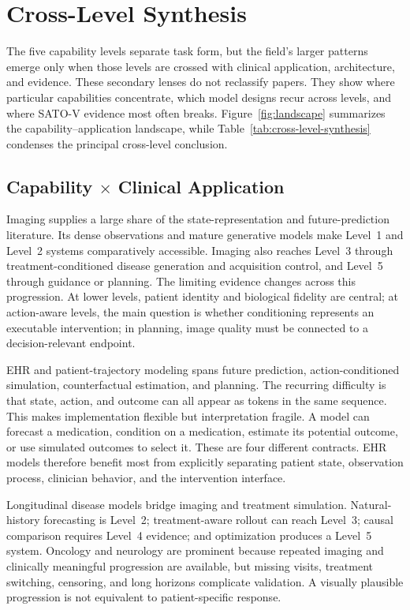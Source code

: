 \section{Cross-Level Synthesis}
\label{sec:synthesis}

The five capability levels separate task form, but the field's larger patterns emerge only when those levels are crossed with clinical application, architecture, and evidence. These secondary lenses do not reclassify papers. They show where particular capabilities concentrate, which model designs recur across levels, and where SATO-V evidence most often breaks. Figure~\ref{fig:landscape} summarizes the capability--application landscape, while Table~\ref{tab:cross-level-synthesis} condenses the principal cross-level conclusion.



\subsection{Capability $\times$ Clinical Application}

Imaging supplies a large share of the state-representation and future-prediction literature. Its dense observations and mature generative models make Level~1 and Level~2 systems comparatively accessible. Imaging also reaches Level~3 through treatment-conditioned disease generation and acquisition control, and Level~5 through guidance or planning. The limiting evidence changes across this progression. At lower levels, patient identity and biological fidelity are central; at action-aware levels, the main question is whether conditioning represents an executable intervention; in planning, image quality must be connected to a decision-relevant endpoint.

EHR and patient-trajectory modeling spans future prediction, action-conditioned simulation, counterfactual estimation, and planning. The recurring difficulty is that state, action, and outcome can all appear as tokens in the same sequence. This makes implementation flexible but interpretation fragile. A model can forecast a medication, condition on a medication, estimate its potential outcome, or use simulated outcomes to select it. These are four different contracts. EHR models therefore benefit most from explicitly separating patient state, observation process, clinician behavior, and the intervention interface.

Longitudinal disease models bridge imaging and treatment simulation. Natural-history forecasting is Level~2; treatment-aware rollout can reach Level~3; causal comparison requires Level~4 evidence; and optimization produces a Level~5 system. Oncology and neurology are prominent because repeated imaging and clinically meaningful progression are available, but missing visits, treatment switching, censoring, and long horizons complicate validation. A visually plausible progression is not equivalent to patient-specific response.

